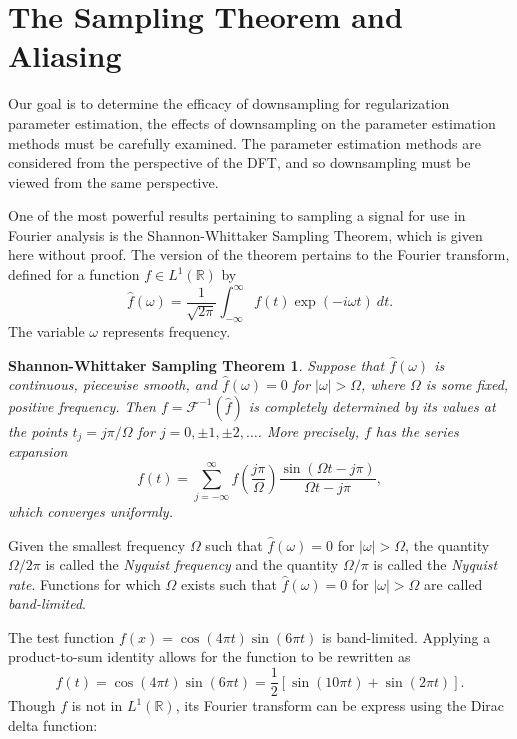 \documentclass[12pt]{book}
\newtheorem*{SWST}{Shannon-Whittaker Sampling Theorem}
\begin{document}
\section{The Sampling Theorem and Aliasing} \label{sec:The Sampling Theorem and Aliasing}
Our goal is to determine the efficacy of downsampling for regularization parameter estimation, the effects of downsampling on the parameter estimation methods must be carefully examined. The parameter estimation methods are considered from the perspective of the DFT, and so downsampling must be viewed from the same perspective. \par 
One of the most powerful results pertaining to sampling a signal for use in Fourier analysis is the Shannon-Whittaker Sampling Theorem, which is given here without proof. The version of the theorem pertains to the Fourier transform, defined for a function $f \in L^1(\mathbb{R})$ by
\begin{equation}
\widehat{f}(\omega) = \frac{1}{\sqrt{2\pi}}\int_{-\infty}^{\infty} f(t)\exp(-i\omega{t})\: dt. 
\label{eq:FourierTransform}
\end{equation}
The variable $\omega$ represents frequency. 
\begin{SWST}
Suppose that $\widehat{f}(\omega)$ is continuous, piecewise smooth, and $\widehat{f}(\omega) = 0$ for $|\omega| > \Omega$, where $\Omega$ is some fixed, positive frequency. Then $f = \mathcal{F}^{-1}(\widehat{f})$ is completely determined by its values at the points $t_j = j\pi/\Omega$ for $j = 0,\pm 1,\pm 2,\ldots$. More precisely, $f$ has the series expansion
\[f(t) = \sum_{j=-\infty}^{\infty} f\left(\frac{j\pi}{\Omega}\right)\frac{\sin(\Omega{t}-j\pi)}{\Omega{t}-j\pi},\]
which converges uniformly. 
\end{SWST}
Given the smallest frequency $\Omega$ such that $\widehat{f}(\omega) = 0$ for $|\omega| > \Omega$, the quantity $\Omega/2\pi$ is called the \textit{Nyquist frequency} and the quantity $\Omega/\pi$ is called the \textit{Nyquist rate}. Functions for which $\Omega$ exists such that $\widehat{f}(\omega) = 0$ for $|\omega| > \Omega$ are called \textit{band-limited}. \par 
The test function $f(x) = \cos(4\pi{t})\sin(6\pi{t})$ is band-limited. Applying a product-to-sum identity allows for the function to be rewritten as
\begin{equation}
f(t) = \cos(4\pi{t})\sin(6\pi{t}) = \frac{1}{2}\left[\sin(10\pi{t}) + \sin(2\pi{t})\right].
\label{eq:Test Function 1}
\end{equation}
Though $f$ is not in $L^1(\mathbb{R})$, its Fourier transform can be express using the Dirac delta function:
\end{document}
